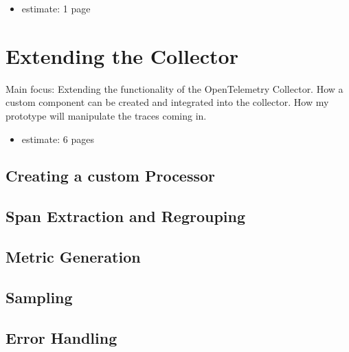\begin{itemize}
    \item estimate: 1 page
\end{itemize}

\section{Extending the Collector}
\label{sec:c_extending_the_collector}

Main focus: Extending the functionality of the OpenTelemetry Collector.
How a custom component can be created and integrated into the collector.
How my prototype will manipulate the traces coming in.

\begin{itemize}
    \item estimate: 6 pages
\end{itemize}

\subsection{Creating a custom Processor}
\subsection{Span Extraction and Regrouping}
\subsection{Metric Generation}
\subsection{Sampling}
\subsection{Error Handling}